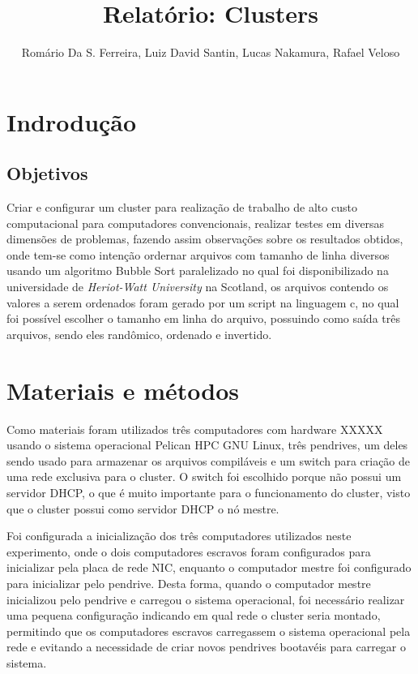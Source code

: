 \documentclass[12pt]{article}
\title{\textbf{Relatório}: Clusters}
\author{
    Romário Da S. Ferreira\inst{1},
    Luiz David Santin\inst{2},
    Lucas Nakamura\inst{3},
    Rafael Veloso \inst{4}
}
\begin{document}
 

\maketitle

\section{Indrodução}
\subsection{Objetivos}

Criar e configurar um cluster para realização de trabalho de alto custo computacional para computadores convencionais, realizar testes em diversas dimensões de problemas, fazendo assim observações sobre os resultados obtidos, onde tem-se como intenção ordernar arquivos com tamanho de linha diversos usando um algoritmo Bubble Sort paralelizado no qual foi disponibilizado na universidade de \textit{Heriot-Watt University} na Scotland, os arquivos contendo os valores a serem ordenados foram gerado por um script na linguagem c, no qual foi possível escolher o tamanho em linha do arquivo, possuindo como saída três arquivos, sendo eles randômico, ordenado e invertido.

\section{Materiais e métodos} \label{sec:firstpage}

Como materiais foram utilizados três computadores com hardware XXXXX usando o 
sistema operacional Pelican HPC GNU Linux, três pendrives, um deles sendo usado para armazenar os arquivos compiláveis e um switch para criação de uma rede exclusiva para o cluster. O switch foi escolhido porque não possui um servidor DHCP, o que é muito importante para o funcionamento do cluster, visto que o cluster possui como servidor DHCP o nó mestre.

Foi configurada a inicialização dos três computadores utilizados neste experimento, onde o dois computadores escravos foram configurados para inicializar pela placa de rede NIC, enquanto o computador mestre foi configurado para inicializar pelo pendrive. Desta forma, quando o computador mestre inicializou pelo pendrive e carregou o sistema operacional, foi necessário realizar uma pequena configuração indicando em qual rede o cluster seria montado, permitindo que os computadores escravos carregassem o sistema operacional pela rede e evitando a necessidade de criar novos pendrives bootavéis para carregar o sistema.
\end{document}
